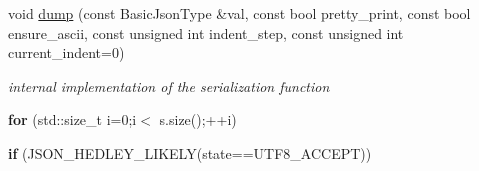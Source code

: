 \begin{DoxyCompactItemize}
\item 
void \hyperlink{classnlohmann_1_1detail_1_1serializer_a95460ebd1a535a543e5a0ec52e00f48b}{dump} (const Basic\+Json\+Type \&val, const bool pretty\+\_\+print, const bool ensure\+\_\+ascii, const unsigned int indent\+\_\+step, const unsigned int current\+\_\+indent=0)
\begin{DoxyCompactList}\small\item\em internal implementation of the serialization function \end{DoxyCompactList}\item 
\mbox{\label{classnlohmann_1_1detail_1_1serializer_ab14b8ec1f8102aa4c7e3c349f317654e}} 
{\bfseries for} (std\+::size\+\_\+t i=0;i$<$ s.\+size();++i)
\item 
\mbox{\label{classnlohmann_1_1detail_1_1serializer_a6705bbf2de3070ec50a810a32e72309f}} 
{\bfseries if} (J\+S\+O\+N\+\_\+\+H\+E\+D\+L\+E\+Y\+\_\+\+L\+I\+K\+E\+LY(state==U\+T\+F8\+\_\+\+A\+C\+C\+E\+PT))
\end{DoxyCompactItemize}
